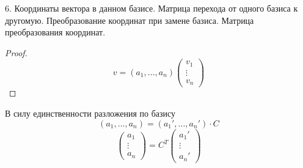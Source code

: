 \documentclass[12pt, fleqn]{article}
\begin{document}
\begin{question} {6. Координаты вектора в данном базисе. Матрица перехода от одного базиса к другомую. Преобразование координат при замене базиса. Матрица преобразования координат.}
\begin{proof}
				\[v = (a_1, ..., a_n) \begin{pmatrix}
					v_1\\
					\vdots\\
					v_n
				\end{pmatrix} \]
			\end{proof}
			В силу единственности разложения по базису
			\[(a_1, ..., a_n) = (a_1', ..., a_n') \cdot C  \]
			\[\begin{pmatrix}
				a_1\\
				\vdots\\
				a_n
			\end{pmatrix} = C^T 
			\begin{pmatrix}
				a_1'\\
				\vdots\\
				a_n'
			\end{pmatrix}\]
\end{question}
\end{document}
